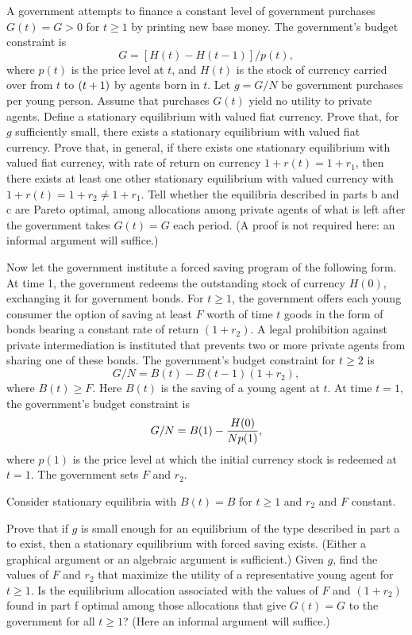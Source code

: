 A government attempts to finance a constant level of government purchases
$G(t)=G>0$ for $t\ge 1$ by printing new base money.  The government's budget
constraint is
$$G=[H(t)-H(t-1)]/p(t),$$
where $p(t)$ is the price level at $t$, and $H(t)$ is the stock of currency
carried over from $t$ to $({t+1})$ by agents born in $t$.  Let $g=G/N$ be
government purchases per young person.  Assume that purchases $G(t)$ yield no
utility to private agents.
\medskip{} Define a stationary equilibrium with valued fiat currency.
\medskip{} Prove that, for $g$ sufficiently small, there exists a stationary
equilibrium with valued fiat currency.
\medskip{} Prove that, in general, if there exists one stationary equilibrium
with valued fiat currency, with rate of return on currency $1+r(t)=1+r_1$, then
there exists at least one other stationary equilibrium with valued currency
with $1+r(t)=1+r_2 \not=1+r_1$.
\medskip{} Tell whether the equilibria described in parts  b and c
 are Pareto
optimal, among allocations among private agents of what is
left after the government takes $G(t)=G$ each period. (A proof is not required
here: an informal argument will suffice.)

Now let the government institute a forced saving program of the following form.
At time 1, the government redeems the outstanding stock of currency $H(0)$,
exchanging it for government bonds.  For $t\ge 1$, the government offers each
young consumer the option of saving at least $F$ worth of time $t$ goods in the
form of bonds bearing a constant rate of return $(1+r_2)$.  A legal prohibition
against private intermediation is instituted that prevents two or more private
agents from sharing one of these bonds.  The government's budget constraint for
$t\ge 2$ is
$$G/N =B(t) -B(t-1)(1+r_2),$$
where $B(t) \ge F$.  Here $B(t)$ is the saving of a young agent at $t$.  At
time $t=1$, the government's budget constraint is
$$G/N =B(1) -{H(0)\over Np (1)},$$
where $p(1)$ is the price level at which the initial currency stock is redeemed
at $t=1$.  The government sets $F$ and $r_2$.

Consider stationary equilibria with $B(t)=B$ for $t\ge 1$ and $r_2$ and $F$
constant.

\medskip{}
 Prove that if $g$ is small enough for an equilibrium of the type
described in part a to
exist, then a stationary equilibrium with forced saving exists. (Either a
graphical argument or an algebraic argument is sufficient.)
\medskip{} Given $g$, find the values of $F$ and $r_2$ that maximize the utility
of a representative young agent for $t\ge 1$.
\medskip{} Is the equilibrium
 allocation associated with the values of $F$ and
$(1+r_2)$ found in part f optimal among those allocations that give $G(t)=G$ to
the government for all $t\ge 1$?  (Here an informal argument will suffice.)
